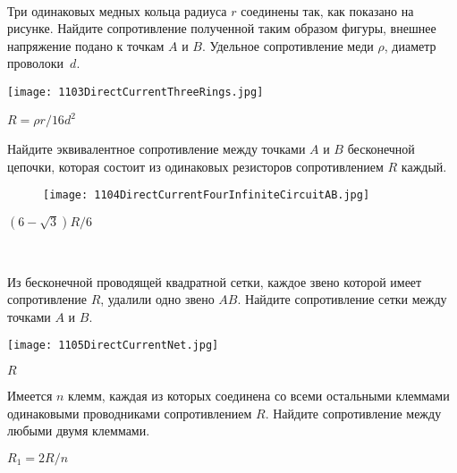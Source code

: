 \begin{ex}
\hspace{0pt} \\
\begin{minipage}{.65\textwidth}
Три одинаковых медных кольца радиуса $r$ соединены так, как показано на рисунке. 
Найдите сопротивление полученной таким образом фигуры, внешнее напряжение подано к точкам $A$ и $B$. 
Удельное сопротивление меди $\rho$, диаметр проволоки~$d$.
\end{minipage}
\begin{minipage}{.35\textwidth}
\centering
\texttt{[image: 1103DirectCurrentThreeRings.jpg]}
\end{minipage}
\begin{ans}
$R = \rho r /16d^2$
\end{ans}
\end{ex}

\begin{ex}
Найдите эквивалентное сопротивление между точками $A$ и $B$ бесконечной цепочки, которая состоит из одинаковых резисторов сопротивлением $R$ каждый.
\begin{figure}[H]
\centering
\texttt{[image: 1104DirectCurrentFourInfiniteCircuitAB.jpg]}
\end{figure}
\begin{ans}
$(6-\sqrt{3})R/6$
\end{ans}
\end{ex}

\begin{ex}
\hspace{0pt} \\
\begin{minipage}{.65\textwidth}
Из бесконечной проводящей квадратной сетки, каждое звено которой имеет сопротивление $R$, удалили одно звено $AB$. Найдите сопротивление сетки между точками $A$ и $B$.
\end{minipage}
\begin{minipage}{.35\textwidth}
\centering
\texttt{[image: 1105DirectCurrentNet.jpg]}
\end{minipage}
\begin{ans}
$R$
\end{ans}
\end{ex}

\begin{ex}
Имеется $n$ клемм, каждая из которых соединена со всеми остальными клеммами одинаковыми проводниками сопротивлением $R$. Найдите сопротивление между любыми двумя клеммами.
\begin{ans}
$R_1 = 2R/n$
\end{ans}
\end{ex}

